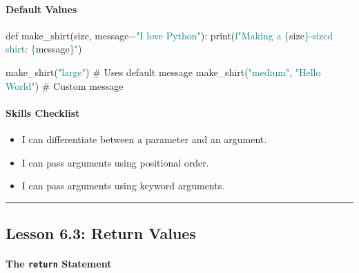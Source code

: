 \documentclass[
  justified,
  openright,
]{tufte-book}
\let\subsubsection\paragraph
\let\paragraph\paragraph
\newcommand{\BuiltInTok}[1]{#1}
\newcommand{\CommentTok}[1]{\textcolor{MidGray}{#1}}
\newcommand{\KeywordTok}[1]{\textcolor{BrandBlue}{#1}}
\newcommand{\NormalTok}[1]{#1}
\newcommand{\OperatorTok}[1]{\textcolor{DarkGray}{#1}}
\newcommand{\SpecialCharTok}[1]{\textcolor{Teal}{#1}}
\newcommand{\SpecialStringTok}[1]{\textcolor{Teal}{#1}}
\newcommand{\StringTok}[1]{\textcolor{Teal}{#1}}
\newenvironment{Shaded}{%
  \begin{snugshade}
}{%
  \end{snugshade}
}
\let\subsubsection\paragraph
\let\paragraph\paragraph
\providecommand{\tightlist}{%
  \setlength{\itemsep}{0pt}\setlength{\parskip}{0pt}}
\begin{document}
\subsubsection{Default Values}\label{default-values}

\begin{Shaded}
\begin{Highlighting}[]
\KeywordTok{def}\NormalTok{ make\_shirt(size, message}\OperatorTok{=}\StringTok{"I love Python"}\NormalTok{):}
    \BuiltInTok{print}\NormalTok{(}\SpecialStringTok{f"Making a }\SpecialCharTok{\{}\NormalTok{size}\SpecialCharTok{\}}\SpecialStringTok{{-}sized shirt: \textquotesingle{}}\SpecialCharTok{\{}\NormalTok{message}\SpecialCharTok{\}}\SpecialStringTok{\textquotesingle{}"}\NormalTok{)}

\NormalTok{make\_shirt(}\StringTok{"large"}\NormalTok{)                       }\CommentTok{\# Uses default message}
\NormalTok{make\_shirt(}\StringTok{"medium"}\NormalTok{, }\StringTok{"Hello World"}\NormalTok{)       }\CommentTok{\# Custom message}
\end{Highlighting}
\end{Shaded}

\subsubsection{Skills Checklist}\label{skills-checklist-28}

\begin{itemize}
\tightlist
\item[$\square$]
  I can differentiate between a parameter and an argument.
\item[$\square$]
  I can pass arguments using positional order.
\item[$\square$]
  I can pass arguments using keyword arguments.
\end{itemize}

\begin{center}\rule{0.5\linewidth}{0.5pt}\end{center}

\subsection{Lesson 6.3: Return Values}\label{lesson-6.3-return-values}

\subsubsection{\texorpdfstring{The \texttt{return}
Statement}{The return Statement}}\label{the-return-statement}
\end{document}
